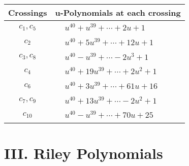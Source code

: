 \documentclass[1p]{elsarticle_modified}
\theoremstyle{definition}
\begin{document}
\begin{tabular}{m{50pt}|m{274pt}}
Crossings & \hspace{64pt}u-Polynomials at each crossing \\
\hline $$\begin{aligned}c_{1},c_{5}\end{aligned}$$&$\begin{aligned}
&u^{40}+u^{39}+\cdots+2 u+1
\end{aligned}$\\
\hline $$\begin{aligned}c_{2}\end{aligned}$$&$\begin{aligned}
&u^{40}+5 u^{39}+\cdots+12 u+1
\end{aligned}$\\
\hline $$\begin{aligned}c_{3},c_{8}\end{aligned}$$&$\begin{aligned}
&u^{40}- u^{39}+\cdots-2 u^3+1
\end{aligned}$\\
\hline $$\begin{aligned}c_{4}\end{aligned}$$&$\begin{aligned}
&u^{40}+19 u^{39}+\cdots+2 u^2+1
\end{aligned}$\\
\hline $$\begin{aligned}c_{6}\end{aligned}$$&$\begin{aligned}
&u^{40}+3 u^{39}+\cdots+61 u+16
\end{aligned}$\\
\hline $$\begin{aligned}c_{7},c_{9}\end{aligned}$$&$\begin{aligned}
&u^{40}+13 u^{39}+\cdots-2 u^2+1
\end{aligned}$\\
\hline $$\begin{aligned}c_{10}\end{aligned}$$&$\begin{aligned}
&u^{40}- u^{39}+\cdots+70 u+25
\end{aligned}$\\
\hline
\end{tabular}\newpage\renewcommand{\arraystretch}{1}
\centering \section*{ III. Riley Polynomials}
\end{document}
